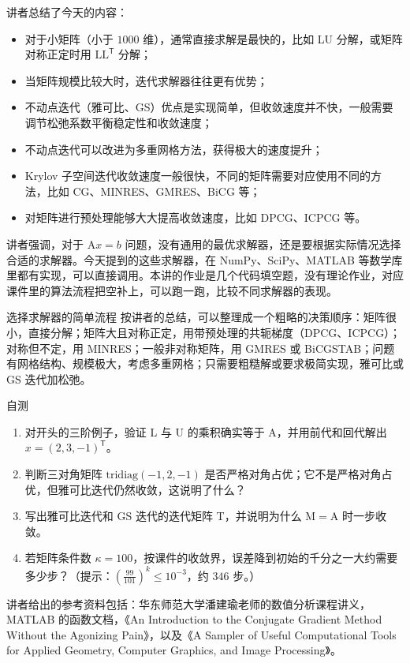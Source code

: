 \documentclass[a4paper]{article}
\begin{document}
讲者总结了今天的内容：
\begin{itemize}
\item 对于小矩阵（小于 $1000$ 维），通常直接求解是最快的，比如 LU 分解，或矩阵对称正定时用 $\mathrm{LL}^{\mathsf T}$ 分解；
\item 当矩阵规模比较大时，迭代求解器往往更有优势；
\item 不动点迭代（雅可比、GS）优点是实现简单，但收敛速度并不快，一般需要调节松弛系数平衡稳定性和收敛速度；
\item 不动点迭代可以改进为多重网格方法，获得极大的速度提升；
\item Krylov 子空间迭代收敛速度一般很快，不同的矩阵需要对应使用不同的方法，比如 CG、MINRES、GMRES、BiCG 等；
\item 对矩阵进行预处理能够大大提高收敛速度，比如 DPCG、ICPCG 等。
\end{itemize}
讲者强调，对于 $\mathrm{A}x=b$ 问题，没有通用的最优求解器，还是要根据实际情况选择合适的求解器。今天提到的这些求解器，在 NumPy、SciPy、MATLAB 等数学库里都有实现，可以直接调用。本讲的作业是几个代码填空题，没有理论作业，对应课件里的算法流程把空补上，可以跑一跑，比较不同求解器的表现。

\begin{importantbox}{选择求解器的简单流程}
按讲者的总结，可以整理成一个粗略的决策顺序：矩阵很小，直接分解；矩阵大且对称正定，用带预处理的共轭梯度（DPCG、ICPCG）；对称但不定，用 MINRES；一般非对称矩阵，用 GMRES 或 BiCGSTAB；问题有网格结构、规模极大，考虑多重网格；只需要粗糙解或要求极简实现，雅可比或 GS 迭代加松弛。
\end{importantbox}

\begin{practicebox}{自测}
\begin{enumerate}
\item 对开头的三阶例子，验证 $\mathrm{L}$ 与 $\mathrm{U}$ 的乘积确实等于 A，并用前代和回代解出 $x=(2,3,-1)^{\mathsf T}$。
\item 判断三对角矩阵 $\mathrm{tridiag}(-1,2,-1)$ 是否严格对角占优；它不是严格对角占优，但雅可比迭代仍然收敛，这说明了什么？
\item 写出雅可比迭代和 GS 迭代的迭代矩阵 T，并说明为什么 $\mathrm{M}=\mathrm{A}$ 时一步收敛。
\item 若矩阵条件数 $\kappa=100$，按课件的收敛界，误差降到初始的千分之一大约需要多少步？（提示：$\left(\frac{99}{101}\right)^k\le 10^{-3}$，约 $346$ 步。）
\end{enumerate}
\end{practicebox}

讲者给出的参考资料包括：华东师范大学潘建瑜老师的数值分析课程讲义，MATLAB 的函数文档，《An Introduction to the Conjugate Gradient Method Without the Agonizing Pain》，以及《A Sampler of Useful Computational Tools for Applied Geometry, Computer Graphics, and Image Processing》。
\end{document}
